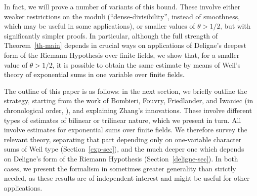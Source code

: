 \documentclass[12pt,a4paper,reqno]{amsart}
\numberwithin{equation}{section}
\theoremstyle{plain}
\theoremstyle{definition}
\begin{document}
In fact, we will prove a number of variants of this bound. These
involve either weaker restrictions on the moduli
(``dense-divisibility'', instead of smoothness, which may be useful in
some applications), or smaller values of $\theta>1/2$, but with
significantly simpler proofs.  In particular, although the full strength of
Theorem~\ref{th-main} depends in crucial ways on applications of
Deligne's deepest form of the Riemann Hypothesis over finite fields,
we show that, for a smaller value of $\theta>1/2$, it is possible to
obtain the same estimate by means of Weil's theory of exponential sums
in one variable over finite fields.
\par
\medskip
\par
The outline of this paper is as follows: in the next section, we
briefly outline the strategy, 
starting from the work of Bombieri, Fouvry, Friedlander, and Iwaniec
(in chronological order, \cite{fi, fi-2, fi-3, bfi, bfi-2, bfi-3,
  fik-3}), and explaining Zhang's innovations. These involve different 
types of estimates of bilinear or trilinear nature, which we present
in turn. All involve estimates for exponential sums over finite
fields.  We therefore survey the relevant theory, separating that part
depending only on one-variable character sums of Weil type
(Section~\ref{exp-sec}), and the much deeper one which depends on Deligne's
form of the Riemann Hypothesis (Section~\ref{deligne-sec}).  In both
cases, we present the formalism in sometimes greater generality than
strictly needed, as these results are of independent interest and
might be useful for other applications.

\end{document}
